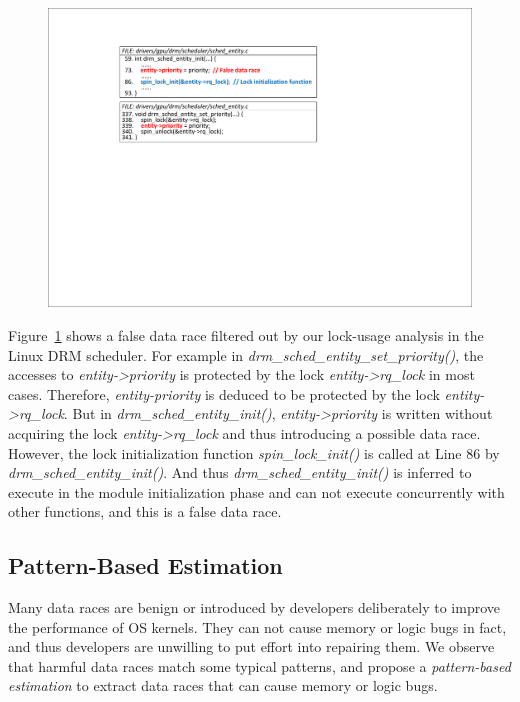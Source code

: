 \begin{figure}[htbp]
	\centering
	\includegraphics[width=0.9\linewidth]{figures/fig_demo_lock_usage.pdf}
	\label{fig_demo_lock_usage}
\end{figure}

 Figure~\ref{fig_demo_lock_usage} shows a false 
data race filtered out by our lock-usage analysis in the Linux DRM scheduler. 
For example in {\em drm\_sched\_entity\_set\_priority()}, the accesses to {\em 
entity->priority} is protected by the lock {\em entity->rq\_lock} in most 
cases. Therefore, {\em entity-priority} is deduced to be protected by the lock 
{\em entity->rq\_lock}. But in {\em drm\_sched\_entity\_init()}, {\em 
entity->priority} is written without acquiring the lock {\em entity->rq\_lock} 
and thus introducing a possible data race. However, the lock initialization 
function {\em spin\_lock\_init()} is called at Line 86 by {\em 
drm\_sched\_entity\_init()}. And thus {\em drm\_sched\_entity\_init()} is 
inferred to execute in the module initialization phase and can not execute 
concurrently with other functions, and this is a false data race.

\subsection{Pattern-Based Estimation}
\label{subsec_estimation}
Many data races are benign or introduced by developers deliberately to improve 
the performance of OS kernels. They can not cause memory or logic bugs in fact, 
and thus developers are unwilling to put effort into repairing them. We observe 
that harmful data races match some typical patterns, and propose a {\em 
pattern-based estimation} to extract data races that can cause memory or logic 
bugs.

